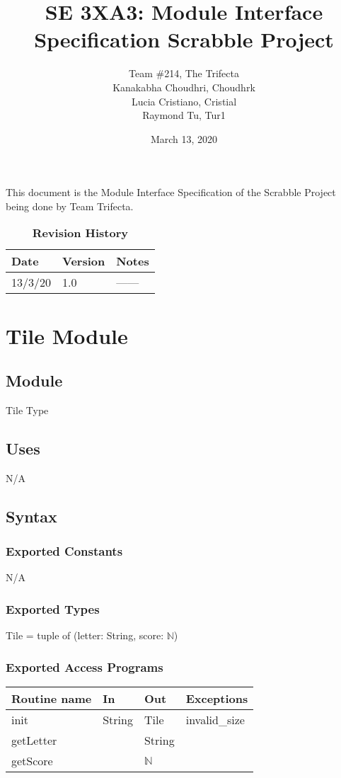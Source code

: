 \documentclass[12pt]{article}
\title{SE 3XA3: Module Interface Specification Scrabble Project}
\author{Team \#214, The Trifecta
		\\ Kanakabha Choudhri, Choudhrk
		\\ Lucia Cristiano, Cristial
		\\ Raymond Tu, Tur1
}
\date{March 13, 2020}
\begin{document}
 
\maketitle

This document is the Module Interface Specification of the Scrabble Project being done by Team Trifecta. 

\begin{table}[bp]
\caption{\bf Revision History}
\begin{tabularx}{\textwidth}{p{3cm}p{2cm}X}
\toprule {\bf Date} & {\bf Version} & {\bf Notes}\\
\midrule
13/3/20 & 1.0 & ------\\
\bottomrule
\end{tabularx}
\end{table}

\newpage

\section* {Tile Module}

\subsection*{Module}

Tile Type

\subsection* {Uses}
N/A

\subsection* {Syntax}

\subsubsection* {Exported Constants}
N/A
\subsubsection* {Exported Types}
Tile = tuple of (letter: String, score: $\mathbb{N}$)

\subsubsection* {Exported Access Programs}

\begin{tabular}{| l | l | l | l |}
\hline
\textbf{Routine name} & \textbf{In} & \textbf{Out} & \textbf{Exceptions}\\
\hline
init & String & Tile & invalid\_size \\
\hline
getLetter &  & String & \\
\hline
getScore & & $\mathbb{N}$ & \\
\hline
\end{tabular}
\end{document}
